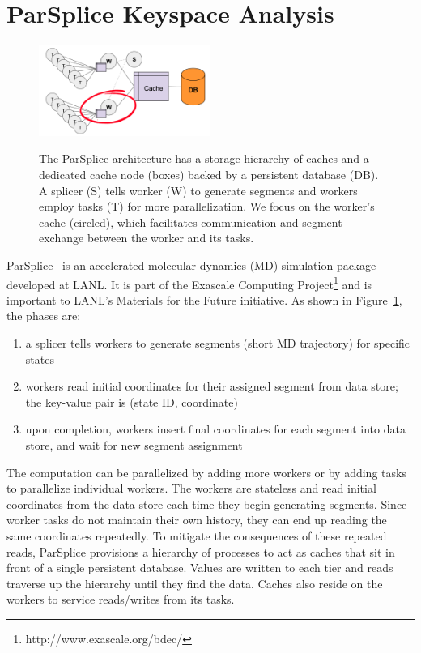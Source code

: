\section{ParSplice Keyspace Analysis}
\label{sec:parsplice-keyspace-analysis}

\begin{figure}[t]
\noindent\includegraphics[width=0.5\textwidth]{figures/parsplice.png}\\
\caption{The ParSplice architecture has a storage hierarchy of caches and a
dedicated cache node (boxes) backed by a persistent database (DB). A splicer
(S) tells worker (W) to generate segments and workers employ tasks (T) for more
parallelization. We focus on the worker's cache (circled), which facilitates
communication and segment exchange between the worker and its tasks.
\label{fig:parsplice}}
\end{figure}

ParSplice~\cite{perez:jctc20150parsplice} is an accelerated molecular dynamics
(MD) simulation package developed at LANL. It is part of the Exascale Computing
Project\footnote{http://www.exascale.org/bdec/} and is important to LANL's
Materials for the Future initiative. As shown in Figure~\ref{fig:parsplice},
the phases are:

\begin{enumerate}

  \item a splicer tells workers to generate segments (short MD trajectory) for
  specific states

  \item workers read initial coordinates for their assigned segment from data
  store; the key-value pair is (state ID, coordinate)

  \item upon completion, workers insert final coordinates for each segment into
  data store, and wait for new segment assignment

\end{enumerate}

The computation can be parallelized by adding more workers or by adding tasks
to parallelize individual workers.  The workers are stateless and read initial
coordinates from the data store each time they begin generating segments. Since
worker tasks do not maintain their own history, they can end up reading the
same coordinates repeatedly. To mitigate the consequences of these repeated
reads, ParSplice provisions a hierarchy of processes to act as caches that sit
in front of a single persistent database.  Values are written to each tier and
reads traverse up the hierarchy until they find the data.  Caches also reside
on the workers to service reads/writes from its tasks.  

